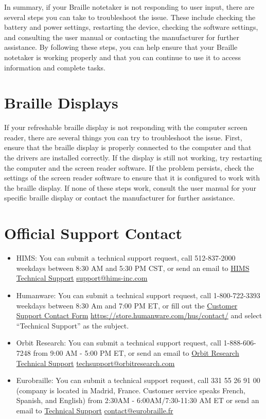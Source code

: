 \documentclass[14pt,letterpaper,twoside]{extreport}
\begin{document}
\begin{appendices}
In summary, if your Braille notetaker is not responding to user input, there are several steps you can take to troubleshoot the issue. These include checking the battery and power settings, restarting the device, checking the software settings, and consulting the user manual or contacting the manufacturer for further assistance. By following these steps, you can help ensure that your Braille notetaker is working properly and that you can continue to use it to access information and complete tasks.  
\hypertarget{display2}{}\section{Braille Displays}\label{display2}
If your refreshable braille display is not responding with the computer screen reader, there are several things you can try to troubleshoot the issue. First, ensure that the braille display is properly connected to the computer and that the drivers are installed correctly. If the display is still not working, try restarting the computer and the screen reader software. If the problem persists, check the settings of the screen reader software to ensure that it is configured to work with the braille display. If none of these steps work, consult the user manual for your specific braille display or contact the manufacturer for further assistance.
\hypertarget{report2}{}\section{Official Support Contact}\label{report2}
\begin{itemize}[leftmargin=*]
\item HIMS: You can submit a technical support request, call 512-837-2000 weekdays between 8:30 AM and 5:30 PM CST, or send an email to \href{support@hims-inc.com}{HIMS Technical Support}  \break\url{support@hims-inc.com}
\item Humanware: You can submit a technical support request, call 1-800-722-3393 weekdays between 8:30 Am and 7:00 PM ET, or fill out the \href{https://store.humanware.com/hus/contact/}{Customer Support Contact Form}  \break\url{https://store.humanware.com/hus/contact/} and select ``Technical Support'' as the subject. 
\item Orbit Research: You can submit a technical support request, call 1-888-606-7248 from 9:00 AM - 5:00 PM ET, or send an email to \href{techsupport@orbitresearch.com}{Orbit Research Technical Support}  \break\url{techsupport@orbitresearch.com}
\item Eurobraille: You can submit a technical support request, call 331 55 26 91 00 (company is located in Madrid, France. Customer service speaks French, Spanish, and English) from 2:30AM - 6:00AM/7:30-11:30 AM ET or send an email to \href{ contact@eurobraille.fr}{Technical Support}  \break\url{ contact@eurobraille.fr}

\end{itemize}
\end{appendices}
\end{document}
